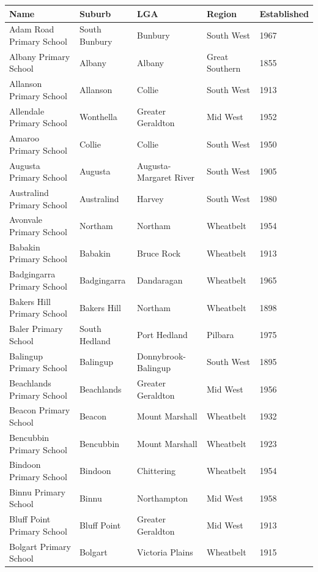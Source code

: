 \documentclass{article}
\begin{document}
\begin{tabular}{lllll}
\toprule
Name & Suburb & LGA & Region & Established \\
\midrule
Adam Road Primary School & South Bunbury & Bunbury & South West & 1967 \\
Albany Primary School & Albany & Albany & Great Southern & 1855 \\
Allanson Primary School & Allanson & Collie & South West & 1913 \\
Allendale Primary School & Wonthella & Greater Geraldton & Mid West & 1952 \\
Amaroo Primary School & Collie & Collie & South West & 1950 \\
Augusta Primary School & Augusta & Augusta-Margaret River & South West & 1905 \\
Australind Primary School & Australind & Harvey & South West & 1980 \\
Avonvale Primary School & Northam & Northam & Wheatbelt & 1954 \\
Babakin Primary School & Babakin & Bruce Rock & Wheatbelt & 1913 \\
Badgingarra Primary School & Badgingarra & Dandaragan & Wheatbelt & 1965 \\
Bakers Hill Primary School & Bakers Hill & Northam & Wheatbelt & 1898 \\
Baler Primary School & South Hedland & Port Hedland & Pilbara & 1975 \\
Balingup Primary School & Balingup & Donnybrook-Balingup & South West & 1895 \\
Beachlands Primary School & Beachlands & Greater Geraldton & Mid West & 1956 \\
Beacon Primary School & Beacon & Mount Marshall & Wheatbelt & 1932 \\
Bencubbin Primary School & Bencubbin & Mount Marshall & Wheatbelt & 1923 \\
Bindoon Primary School & Bindoon & Chittering & Wheatbelt & 1954 \\
Binnu Primary School & Binnu & Northampton & Mid West & 1958 \\
Bluff Point Primary School & Bluff Point & Greater Geraldton & Mid West & 1913 \\
Bolgart Primary School & Bolgart & Victoria Plains & Wheatbelt & 1915 \\
\bottomrule
\end{tabular}
\end{document}
